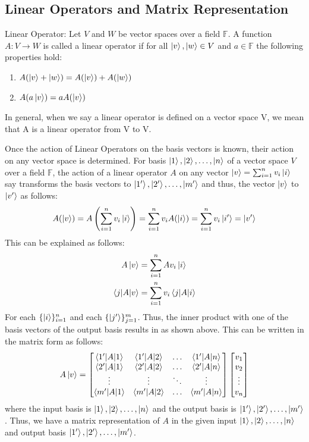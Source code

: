 \subsection{Linear Operators and Matrix Representation}
\begin{definition}
    Linear Operator: Let $V$ and $W$ be vector spaces over a field $\mathbb{F}$. A function $A:V\rightarrow W$ is called a linear operator if for all $\ket{v},\ket{w}\in V$ and $a\in\mathbb{F}$ the following properties hold:
    \begin{enumerate}
        \item $A(\ket{v}+\ket{w})=A(\ket{v})+A(\ket{w})$
        \item $A(a\ket{v})=aA(\ket{v})$
    \end{enumerate}
\end{definition}

In general, when we say a linear operator is defined on a vector space V, we mean that A is a
linear operator from V to V. 

Once the action of Linear Operators on the basis vectors is known,
their action on any vector space is determined. For basis $\ket{1},\ket{2},\ldots,\ket{n}$ of a vector space $V$ over a field $\mathbb{F}$, the action of a linear operator $A$
on any vector $\ket{v}=\sum_{i=1}^n v_i\ket{i}$ say transforms the basis vectors to $\ket{1'}, \ket{2'}, \ldots, \ket{m'}$ and thus, the vector $\ket{v}$ to $\ket{v'}$ as follows:
\[A(\ket{v})=A\left(\sum_{i=1}^n v_i\ket{i}\right)=\sum_{i=1}^n v_iA(\ket{i})=\sum_{i=1}^n v_i \ket{i'}=\ket{v'}\]
This can be explained as follows:
\begin{align*}
A\ket{v}&=\sum_{i=1}^n Av_i\ket{i}\\
\braket{j|A|v}&=\sum_{i=1}^n v_i \braket{j|A|i}
\end{align*}
For each $\{\ket{i}\}_{i=1}^n$ and each $\{\ket{j'}\}_{j=1}^m$. Thus, the inner product with one of the basis vectors of the output basis results in as shown above. This can be written in the matrix form as follows:
\[ 
A\ket{v}=\begin{bmatrix} \braket{1'|A|1} & \braket{1'|A|2} & \ldots & \braket{1'|A|n} \\ \braket{2'|A|1} & \braket{2'|A|2} & \ldots & \braket{2'|A|n} \\ \vdots & \vdots & \ddots & \vdots \\ \braket{m'|A|1} & \braket{m'|A|2} & \ldots & \braket{m'|A|n} \end{bmatrix} \begin{bmatrix} v_1 \\ v_2 \\ \vdots \\ v_n \end{bmatrix} 
\]
where the input basis is $\ket{1},\ket{2},\ldots,\ket{n}$ and the output basis is $\ket{1'},\ket{2'},\ldots,\ket{m'}$. Thus, we have a matrix representation of $A$ in the given input $\ket{1},\ket{2},\ldots,\ket{n}$ and output basis $\ket{1'},\ket{2'},\ldots,\ket{m'}$.

